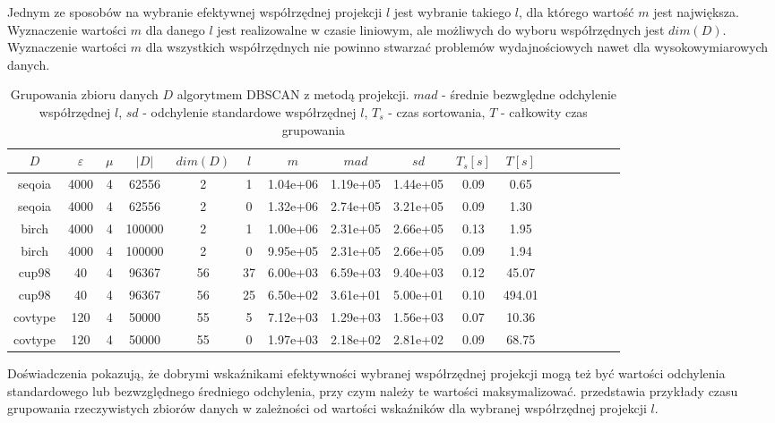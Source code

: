 Jednym ze sposobów na wybranie efektywnej współrzędnej projekcji $ l $ jest wybranie takiego $ l $, dla którego wartość $ m $ jest największa. Wyznaczenie wartości $ m $ dla danego $ l $ jest realizowalne w czasie liniowym, ale możliwych do wyboru współrzędnych jest $ dim(D) $. Wyznaczenie wartości $ m $ dla wszystkich współrzędnych nie powinno stwarzać problemów wydajnościowych nawet dla wysokowymiarowych danych.

\begin{table}[H] 
	\footnotesize
	\tabcolsep=0.11cm
	\centering
	\begin{tabular}{|c|c|c|c|c|c|c|c|c|c|c|c|c|c|c|c|c|}
		\hline 
	$D$			&$ \varepsilon $ & $ \mu $ & $|D|$&$dim(D)$&$l$&$m$&$mad$&$sd$&$T_s [s]$&$T[s]$\\\hline
	seqoia	&4000	&4&62556	&2	&1	&1.04e+06&1.19e+05	&1.44e+05&0.09&0.65		\\\hline
	seqoia	&4000	&4&62556	&2	&0	&1.32e+06&2.74e+05	&3.21e+05&0.09&1.30		\\\hline
	birch		&4000	&4&100000	&2	&1	&1.00e+06&2.31e+05	&2.66e+05&0.13&1.95		\\\hline
	birch		&4000	&4&100000	&2	&0	&9.95e+05&2.31e+05	&2.66e+05&0.09&1.94		\\\hline
	cup98		&40		&4&96367	&56	&37	&6.00e+03&6.59e+03	&9.40e+03&0.12&45.07	\\\hline
	cup98		&40		&4&96367	&56	&25	&6.50e+02&3.61e+01	&5.00e+01&0.10&494.01	\\\hline
	covtype	&120	&4&50000	&55	&5	&7.12e+03&1.29e+03	&1.56e+03&0.07&10.36	\\\hline
	covtype	&120	&4&50000	&55	&0	&1.97e+03&2.18e+02	&2.81e+02&0.09&68.75	\\\hline
	\end{tabular}
	\caption{Grupowania zbioru danych $ D $ algorytmem DBSCAN z metodą projekcji. $ mad $ - średnie bezwględne odchylenie współrzędnej $ l $, $ sd $ - odchylenie standardowe współrzędnej $ l $, $ T_s $ - czas sortowania, $ T $ - całkowity czas grupowania}\label{tbl:projection-time-by-dim}
\end{table}
Doświadczenia pokazują, że dobrymi wskaźnikami efektywności wybranej współrzędnej projekcji mogą też być wartości odchylenia standardowego lub bezwzględnego średniego odchylenia, przy czym należy te wartości maksymalizować.  przedstawia przykłady czasu grupowania rzeczywistych zbiorów danych w zależności od wartości wskaźników dla wybranej współrzędnej projekcji $ l $.

